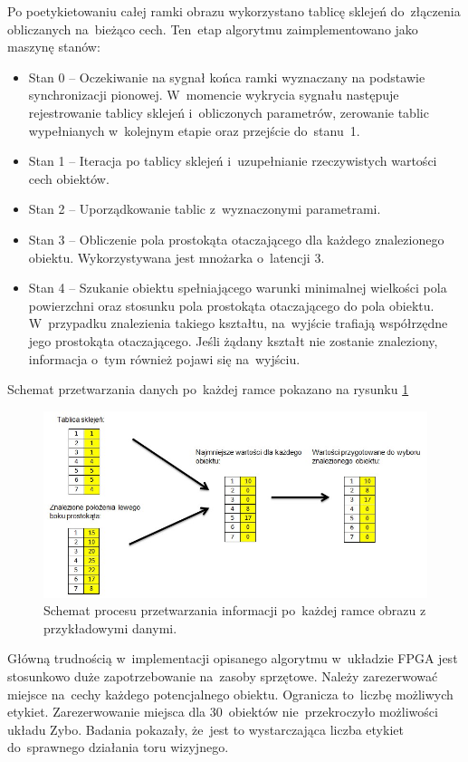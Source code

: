 Po poetykietowaniu całej ramki obrazu wykorzystano tablicę sklejeń do~złączenia obliczanych na~bieżąco cech. 
Ten~etap algorytmu zaimplementowano jako maszynę stanów:
\begin{itemize}
	\item Stan 0 -- Oczekiwanie na sygnał końca ramki wyznaczany na podstawie synchronizacji pionowej. W~momencie wykrycia sygnału następuje rejestrowanie tablicy sklejeń i~obliczonych parametrów, zerowanie tablic wypełnianych w~kolejnym etapie oraz przejście do~stanu~1. %
	\item Stan 1 -- Iteracja po tablicy sklejeń i~uzupełnianie rzeczywistych wartości cech obiektów.
	\item Stan 2 -- Uporządkowanie tablic z~wyznaczonymi parametrami.
	\item Stan 3 -- Obliczenie pola prostokąta otaczającego dla każdego znalezionego obiektu. Wykorzystywana jest mnożarka o~latencji 3.
	\item Stan 4 -- Szukanie obiektu spełniającego warunki minimalnej wielkości pola powierzchni oraz stosunku pola prostokąta otaczającego do pola obiektu. W~przypadku znalezienia takiego kształtu, na~wyjście trafiają współrzędne jego prostokąta otaczającego. Jeśli żądany kształt nie zostanie znaleziony, informacja o~tym również pojawi się na~wyjściu.
\end{itemize}
Schemat przetwarzania danych po~każdej ramce pokazano na rysunku \ref{fig:ind_schemat}
\begin{figure}[h]
	\centering
	\includegraphics[width=\textwidth]{ind_schemat.jpg}
	\caption{Schemat procesu przetwarzania informacji po~każdej ramce obrazu z przykładowymi danymi.}
	\label{fig:ind_schemat}
\end{figure}

Główną trudnością w~implementacji opisanego algorytmu w~układzie FPGA jest stosunkowo duże zapotrzebowanie na~zasoby sprzętowe. 
Należy zarezerwować miejsce na~cechy każdego potencjalnego obiektu. 
Ogranicza to~liczbę możliwych etykiet. 
Zarezerwowanie miejsca dla 30~obiektów nie~przekroczyło możliwości układu Zybo. 
Badania pokazały, że~jest to wystarczająca liczba etykiet do~sprawnego działania toru wizyjnego.

